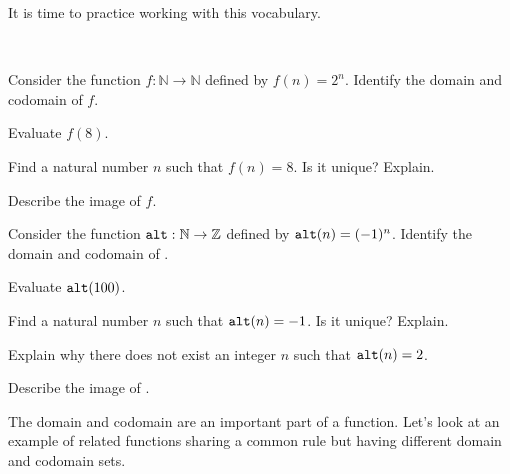 It is time to practice working with this vocabulary.

\begin{act}
\label{act_fn_vocab}
~
    \begin{actpart}
        \item Consider the function $f: \mathbb{N} \to \mathbb{N}$ defined by $f(n) = 2^n$.  Identify the domain and codomain of $f$.
        \item Evaluate $f(8)$.
        \item Find a natural number $n$ such that $f(n) = 8$.  Is it unique?  Explain.
        \item Describe the image of $f$.
        \item Consider the function $\texttt{alt}: \mathbb{N} \to \mathbb{Z}$ defined by $\texttt{alt}(n) = (-1)^n$.  Identify the domain and codomain of .
        \item Evaluate $\texttt{alt}(100)$.
        \item Find a natural number $n$ such that $\texttt{alt}(n) = -1$. Is it unique?  Explain.
        \item Explain why there does not exist an integer $n$ such that $\texttt{alt}(n) = 2$.
        \item Describe the image of .
    \end{actpart}
\end{act}

The domain and codomain are an important part of a function.  Let's look at an example of related functions sharing a common rule but having different domain and codomain sets.

